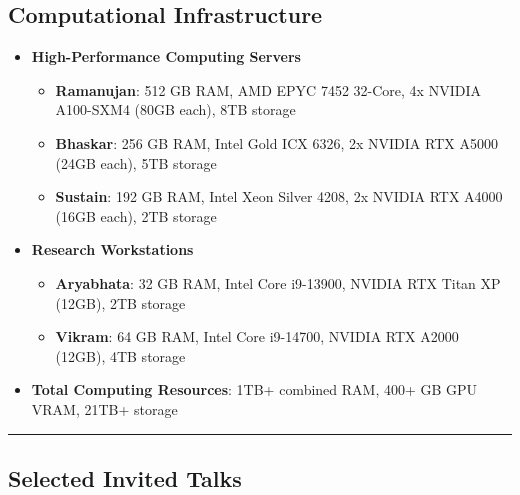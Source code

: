 \documentclass[letter,10pt]{article}
\begin{document}
\subsection*{\textbf{Computational Infrastructure}}
\vspace{-0.4em}
\begin{itemize}
\itemsep0em 
    \item[] \textbf{High-Performance Computing Servers}
    \begin{itemize}
    \item \textbf{Ramanujan}: 512 GB RAM, AMD EPYC 7452 32-Core, 4x NVIDIA A100-SXM4 (80GB each), 8TB storage
    \item \textbf{Bhaskar}: 256 GB RAM, Intel Gold ICX 6326, 2x NVIDIA RTX A5000 (24GB each), 5TB storage  
    \item \textbf{Sustain}: 192 GB RAM, Intel Xeon Silver 4208, 2x NVIDIA RTX A4000 (16GB each), 2TB storage
    \end{itemize}
    
    \item[] \textbf{Research Workstations}
    \begin{itemize}
    \item \textbf{Aryabhata}: 32 GB RAM, Intel Core i9-13900, NVIDIA RTX Titan XP (12GB), 2TB storage
    \item \textbf{Vikram}: 64 GB RAM, Intel Core i9-14700, NVIDIA RTX A2000 (12GB), 4TB storage
    \end{itemize}
    
    \item[] \textbf{Total Computing Resources}: 1TB+ combined RAM, 400+ GB GPU VRAM, 21TB+ storage
\end{itemize}
\fi

\ifcvshort\else
\vspace{0.5em}
\noindent\rule{\textwidth}{0.5pt}
\vspace{-0.2em}
\fi

\subsection*{\textbf{Selected Invited Talks}}
\vspace{-0.4em}
\end{document}
